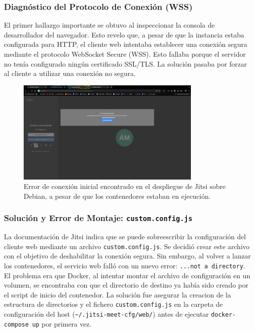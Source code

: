 \subsubsection{Diagnóstico del Protocolo de Conexión (WSS)}
El primer hallazgo importante se obtuvo al inspeccionar la consola de desarrollador del navegador. Esto revelo que, a pesar de que la instancia estaba configurada para HTTP, el cliente web intentaba establecer una conexión segura mediante el protocolo WebSocket Secure (WSS). Esto fallaba porque el servidor no tenía configurado ningún certificado SSL/TLS. La solución pasaba por forzar al cliente a utilizar una conexión no segura.

\begin{figure}[H]
    \centering
    \includegraphics[width=0.8\textwidth]{img/errorconexion.png}
    \caption{Error de conexión inicial encontrado en el despliegue de Jitsi sobre Debian, a pesar de que los contenedores estaban en ejecución.}
    \label{fig:error_conexion_debian}
\end{figure}

\subsubsection{Solución y Error de Montaje: \texttt{custom.config.js}}
La documentación de Jitsi indica que se puede sobreescribir la configuración del cliente web mediante un archivo \texttt{custom.config.js}. Se decidió crear este archivo con el objetivo de deshabilitar la conexión segura. Sin embargo, al volver a lanzar los contenedores, el servicio web falló con un nuevo error: \texttt{...not a directory}. El problema era que Docker, al intentar montar el archivo de configuración en un volumen, se encontraba con que el directorio de destino ya había sido creado por el script de inicio del contenedor. La solución fue asegurar la creacion de la estructura de directorios y el fichero \texttt{custom.config.js} en la carpeta de configuración del host (\texttt{\textasciitilde{}/.jitsi-meet-cfg/web/}) antes de ejecutar \texttt{docker-compose up} por primera vez.

